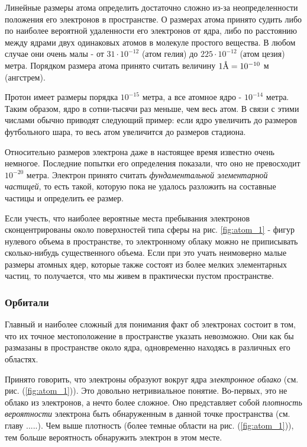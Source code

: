 Линейные размеры атома определить достаточно сложно из-за неопределенности положения его электронов в пространстве.
О размерах атома принято судить либо по наиболее вероятной удаленности его электронов от ядра, либо по расстоянию между ядрами двух одинаковых атомов в молекуле простого вещества.
В любом случае они очень малы - от $31\cdot 10^{-12}$ (атом гелия) до $225\cdot 10^{-12}$ (атом цезия) метра.
Порядком размера атома принято считать величину $1\mbox{\normalfont\AA} = 10^{-10}$ м (ангстрем).

Протон имеет размеры порядка $10^{-15}$ метра, а все атомное ядро - $10^{-14}$ метра.
Таким образом, ядро в сотни-тысячи раз меньше, чем весь атом.
В связи с этими числами обычно приводят следующий пример: если ядро увеличить до размеров футбольного шара, то весь атом увеличится до размеров стадиона.

Относительно размеров электрона даже в настоящее время известно очень немногое.
Последние попытки его определения показали, что оно не превосходит $10^{-20}$ метра.
Электрон принято считать \textit{фундаментальной элементарной частицей}, то есть такой, которую пока не удалось разложить на составные частицы и определить ее размер.

Если учесть, что наиболее вероятные места пребывания электронов сконцентрированы около поверхностей типа сферы на рис. \ref{fig:atom_1} - фигур нулевого объема в пространстве, то электронному облаку можно не приписывать сколько-нибудь существенного объема.
Если при это учать неимоверно малые размеры атомных ядер, которые также состоят из более мелких элементарных частиц, то получается, что мы живем в практически пустом пространстве.

\subsubsection*{Орбитали}

Главный и наиболее сложный для понимания факт об электронах состоит в том, что их точное местоположение в пространстве указать невозможно.
Они как бы размазаны в пространстве около ядра, одновременно находясь в различных его областях.

Принято говорить, что электроны образуют вокруг ядра \textit{электронное облако} (см. рис. (\ref{fig:atom_1})).
Это довольно нетривиальное понятие.
Во-первых, это не облако из электронов, а нечто более сложное.
Оно представляет собой \textit{плотность вероятности} электрона быть обнаруженным в данной точке пространства (см. главу .....).
Чем выше плотность (более темные области на рис. (\ref{fig:atom_1})), тем больше вероятность обнаружить электрон в этом месте.

